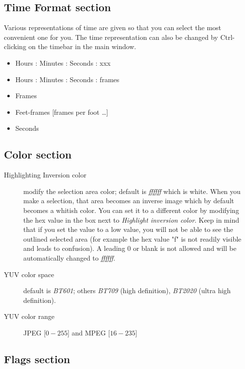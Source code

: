 \subsection{Time Format section}%
\label{sub:time_format_section}

Various representations of time are given so that you can select the most convenient one for you. The time representation can also be changed by Ctrl-clicking on the timebar in the main window.

\begin{itemize}[noitemsep]
    \item Hours : Minutes : Seconds : xxx
    \item Hours : Minutes : Seconds : frames
    \item Frames
    \item Feet-frames  [frames per foot \dots]
    \item Seconds
\end{itemize}

\subsection{Color section}%
\label{sub:color_section}

\begin{description}
    \item[Highlighting Inversion color] modify the selection area color; default is \textit{ffffff} which is white. When you make a selection, that area becomes an inverse image which by default becomes a whitish color.  You can set it to a different color by modifying the hex value in the box next to \textit{Highlight inversion color}.   Keep in mind that if you set the value to a low value, you will not be able to see the outlined selected area (for example the hex value "f" is not readily visible and leads to confusion).  A leading 0 or blank is not allowed and will be automatically changed to \textit{ffffff}.
    \item[YUV color space] default is \textit{BT601}; others \textit{BT709} (high definition), \textit{BT2020} (ultra high definition).
    \item[YUV color range] JPEG [$0-255$] and MPEG [$16-235$]
\end{description}

\subsection{Flags section}%
\label{sub:flags_section}

